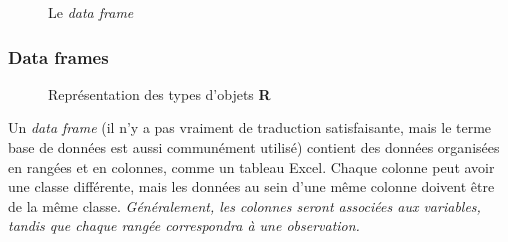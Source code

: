 \documentclass[10.5pt,a4paper]{article}
\begin{document}
    \begin{figure}[H]
    \centering
    \caption{Le \emph{data frame}}
    \label{struDataF}
    \end{figure}
    
    
    \subsubsection{Data frames}
    
    \begin{figure}
      \centering
      \caption{Représentation des types d'objets \textbf{R}}
      \label{lego}
    \end{figure}
    
    Un \emph{data frame} (il n'y a pas vraiment de traduction satisfaisante, mais le terme base de données est aussi communément utilisé) contient des données organisées en rangées et en colonnes, comme un tableau Excel. Chaque colonne peut avoir une classe différente, mais les données au sein d’une même colonne doivent être de la même classe. \emph{Généralement, les colonnes seront associées aux variables, tandis que chaque rangée correspondra à une observation.}
    
\end{document}
